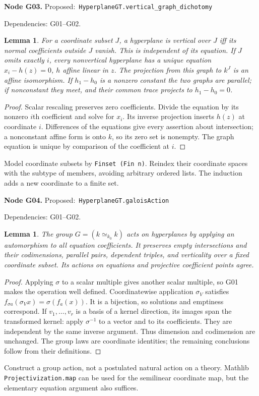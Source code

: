 \documentclass[11pt]{article}
\newtheorem{lemma}[theorem]{Lemma}
\theoremstyle{remark}\newtheorem{remark}[theorem]{Remark}
\newcommand{\code}[1]{\nolinkurl{#1}}
\newcommand{\node}[3]{\par\Needspace{8\baselineskip}\smallskip\noindent\textbf{Node #1.}\quad
 \textsf{Proposed:}\ \code{#2}\par\noindent
 \textsf{Dependencies:} #3.\par\smallskip}
\begin{document}
\node{G03}{HyperplaneGT.vertical_graph_dichotomy}{G01--G02}
\begin{lemma}\label{lem:g03}
For a coordinate subset $J$, a hyperplane is vertical over $J$ iff
its normal coefficients outside $J$ vanish. This is independent of
its equation. If $J$ omits exactly $i$, every nonvertical hyperplane
has a unique equation $x_i-h(z)=0$, $h$ affine linear in $z$.
The projection from this graph to $k^J$ is an affine isomorphism.
If $h_1-h_0$ is a nonzero constant the two graphs are parallel;
if nonconstant they meet, and their common trace projects to
$h_1-h_0=0$.
\end{lemma}
\begin{proof}
Scalar rescaling preserves zero coefficients. Divide the equation
by its nonzero $i$th coefficient and solve for $x_i$. Its inverse
projection inserts $h(z)$ at coordinate $i$. Differences of the
equations give every assertion about intersection; a nonconstant
affine form is onto $k$, so its zero set is nonempty. The graph
equation is unique by comparison of the coefficient at $i$.
\end{proof}
Model coordinate subsets by \texttt{Finset (Fin n)}. Reindex their
coordinate spaces with the subtype of members, avoiding arbitrary
ordered lists. The induction adds a new coordinate to a finite set.

\node{G04}{HyperplaneGT.galoisAction}{G01--G02}
\begin{lemma}\label{lem:g04}
The group $G=(k\simeq_{k_0}k)$ acts on hyperplanes by applying an
automorphism to all equation coefficients. It preserves empty
intersections and their codimensions, parallel pairs, dependent
triples, and verticality over a fixed coordinate subset. Its actions
on equations and projective coefficient points agree.
\end{lemma}
\begin{proof}
Applying $\sigma$ to a scalar multiple gives another scalar multiple,
so G01 makes the operation well defined. Coordinatewise application
$\sigma_V$ satisfies $f_{\sigma a}(\sigma_Vx)=\sigma(f_a(x))$.
It is a bijection, so solutions and emptiness correspond. If
$v_1,\ldots,v_r$ is a basis of a kernel direction, its images span
the transformed kernel: apply $\sigma^{-1}$ to a vector and to
its coefficients. They are independent by the same inverse
argument. Thus dimension and codimension are unchanged. The group
laws are coordinate identities; the remaining conclusions follow
from their definitions.
\end{proof}
Construct a group action, not a postulated natural action on a theory.
Mathlib \code{Projectivization.map} can be used for the semilinear
coordinate map, but the elementary equation argument also suffices.
\end{document}
